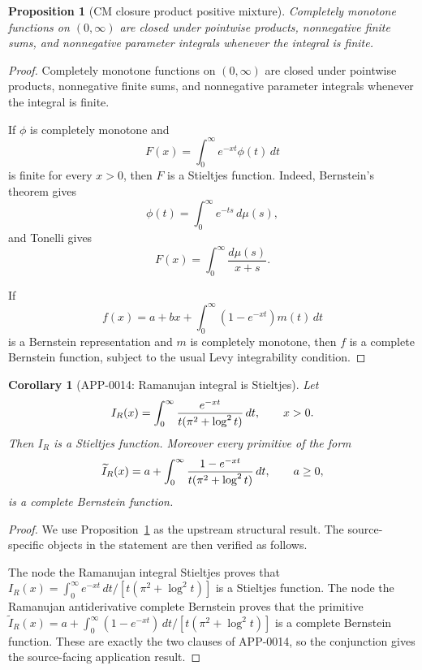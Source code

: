 \documentclass[11pt]{article}
\numberwithin{equation}{section}
\newtheorem{proposition}[theorem]{Proposition}
\newtheorem{corollary}[theorem]{Corollary}
\theoremstyle{definition}
\theoremstyle{remark}
\newcommand{\1}{\mathbf 1}
\begin{document}
\begin{proposition}[CM closure product positive mixture]
\label{res:cm-closure-product-positive-mixture}
Completely monotone functions on \((0,\infty)\) are closed under pointwise products, nonnegative finite sums, and nonnegative parameter integrals whenever the integral is finite.
\end{proposition}

\begin{proof}
Completely monotone functions on \((0,\infty)\) are closed under pointwise products, nonnegative finite sums, and nonnegative parameter integrals whenever the integral is finite.

If \(\phi\) is completely monotone and
\[
F(x)=\int_0^\infty e^{-xt}\phi(t)\,dt
\]
is finite for every \(x>0\), then \(F\) is a Stieltjes function. Indeed, Bernstein's theorem gives
\[
\phi(t)=\int_0^\infty e^{-ts}\,d\mu(s),
\]
and Tonelli gives
\[
F(x)=\int_0^\infty \frac{d\mu(s)}{x+s}.
\]

If
\[
f(x)=a+bx+\int_0^\infty (1-e^{-xt})m(t)\,dt
\]
is a Bernstein representation and \(m\) is completely monotone, then \(f\) is a complete Bernstein function, subject to the usual Levy integrability condition.
\end{proof}

\begin{corollary}[APP-0014: Ramanujan integral is Stieltjes]
\label{thm:app14-ramanujan-stieltjes}
Let
\[
  I_R(x)=\int_0^\infty {e^{-xt}\over t(\pi^2+\log^2 t)}\,dt,
  \qquad x>0 .
\]
Then \(I_R\) is a Stieltjes function.  Moreover every primitive of the form
\[
  \widetilde I_R(x)=a+\int_0^\infty
       {1-e^{-xt}\over t(\pi^2+\log^2 t)}\,dt,\qquad a\ge0,
\]
is a complete Bernstein function.


\end{corollary}

\begin{proof}
We use Proposition~\ref{res:cm-closure-product-positive-mixture} as the upstream structural result. The source-specific objects in the statement are then verified as follows.

The node the Ramanujan integral Stieltjes proves that
\(I_R(x)=\int_0^\infty e^{-xt}\,dt/[t(\pi^2+\log^2 t)]\) is a Stieltjes function. The node the Ramanujan antiderivative complete Bernstein proves that the primitive
\(\widetilde I_R(x)=a+\int_0^\infty(1-e^{-xt})\,dt/[t(\pi^2+\log^2 t)]\)
is a complete Bernstein function. These are exactly the two clauses of APP-0014, so the conjunction gives the source-facing application result.
\end{proof}
\end{document}
